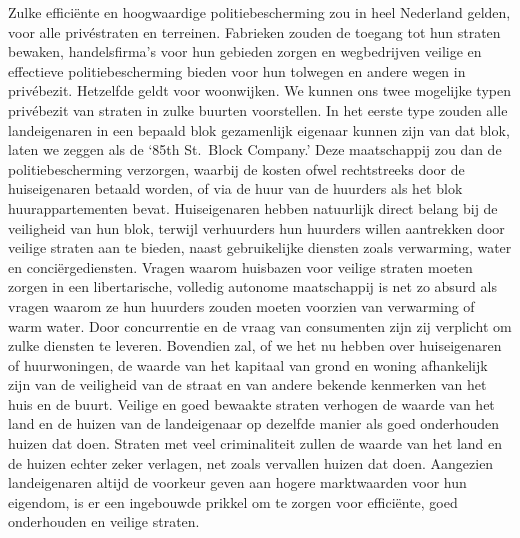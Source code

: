 \documentclass[
  a5paper,
  smalldemyvopaper,10pt,twoside,onecolumn,openright,extrafontsizes,hidelinks]{memoir}
\begin{document}
Zulke efficiënte en hoogwaardige politiebescherming zou in heel
Nederland gelden, voor alle privéstraten en terreinen. Fabrieken zouden
de toegang tot hun straten bewaken, handelsfirma's voor hun gebieden
zorgen en wegbedrijven veilige en effectieve politiebescherming bieden
voor hun tolwegen en andere wegen in privébezit. Hetzelfde geldt voor
woonwijken. We kunnen ons twee mogelijke typen privébezit van straten in
zulke buurten voorstellen. In het eerste type zouden alle landeigenaren
in een bepaald blok gezamenlijk eigenaar kunnen zijn van dat blok, laten
we zeggen als de `85th St.~Block Company.' Deze maatschappij zou dan de
politiebescherming verzorgen, waarbij de kosten ofwel rechtstreeks door
de huiseigenaren betaald worden, of via de huur van de huurders als het
blok huurappartementen bevat. Huiseigenaren hebben natuurlijk direct
belang bij de veiligheid van hun blok, terwijl verhuurders hun huurders
willen aantrekken door veilige straten aan te bieden, naast
gebruikelijke diensten zoals verwarming, water en conciërgediensten.
Vragen waarom huisbazen voor veilige straten moeten zorgen in een
libertarische, volledig autonome maatschappij is net zo absurd als
vragen waarom ze hun huurders zouden moeten voorzien van verwarming of
warm water. Door concurrentie en de vraag van consumenten zijn zij
verplicht om zulke diensten te leveren. Bovendien zal, of we het nu
hebben over huiseigenaren of huurwoningen, de waarde van het kapitaal
van grond en woning afhankelijk zijn van de veiligheid van de straat en
van andere bekende kenmerken van het huis en de buurt. Veilige en goed
bewaakte straten verhogen de waarde van het land en de huizen van de
landeigenaar op dezelfde manier als goed onderhouden huizen dat doen.
Straten met veel criminaliteit zullen de waarde van het land en de
huizen echter zeker verlagen, net zoals vervallen huizen dat doen.
Aangezien landeigenaren altijd de voorkeur geven aan hogere marktwaarden
voor hun eigendom, is er een ingebouwde prikkel om te zorgen voor
efficiënte, goed onderhouden en veilige straten.
\end{document}
